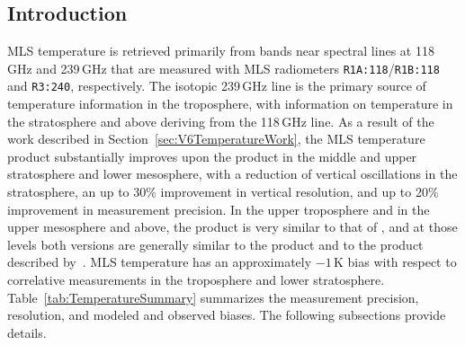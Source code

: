\subsection{Introduction}

 MLS temperature is retrieved primarily from bands near  spectral lines at 118\,GHz and 239\,GHz that are measured with MLS radiometers \texttt{R1A:118}/\texttt{R1B:118} and \texttt{R3:240}, respectively. The isotopic 239\,GHz line is the primary source of temperature information in the troposphere, with information on temperature in the stratosphere and above deriving from the 118\,GHz  line. As a result of the work described in Section~\ref{sec:V6TemperatureWork}, the MLS \thisv temperature product substantially improves upon the \prevv product in the middle and upper stratosphere and lower mesosphere, with a reduction of vertical oscillations in the stratosphere, an up to 30\% improvement in vertical resolution, and up to 20\% improvement in measurement precision. In the upper troposphere and in the upper mesosphere and above, the \thisv product is very similar to that of \prevv, and at those levels both versions are generally similar to the \viii product and to the \vii product described by~\citet{SchwartzEtal:2008:Validation}. MLS \thisv temperature has an approximately $-1\,$K bias with respect to correlative measurements in the troposphere and lower stratosphere. Table~\ref{tab:TemperatureSummary} summarizes the measurement precision, resolution, and modeled and observed biases. The following subsections provide details.

